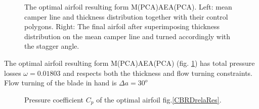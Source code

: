 \begin{figure}[h!]
\begin{minipage}[b]{1\linewidth}
 \centering
\end{minipage}
\caption{The optimal airfoil resulting form M(PCA)AEA(PCA). Left: mean camper line and thickness distribution together with their control polygons. Right: The final airfoil after superimposing thickness distribution on the mean camper line and turned accordingly with the stagger angle.} 
\label{PCADrelaRes}
\end{figure}

The optimal airfoil resulting form M(PCA)AEA(PCA) (fig. \ref{PCADrelaRes}) has total pressure losses $\omega=0.01803$ and respects both the thickness and flow turning constraints.  Flow turning of the blade in hand is $\Delta a=30^o$

\begin{figure}[h!]
\begin{minipage}[b]{1\linewidth}
 \centering
\end{minipage}
\caption{Pressure coefficient $C_p$ of the optimal airfoil fig.\ref{CBRDrelaRes}.} 
\label{PCADrelaRes_cp}
\end{figure}

